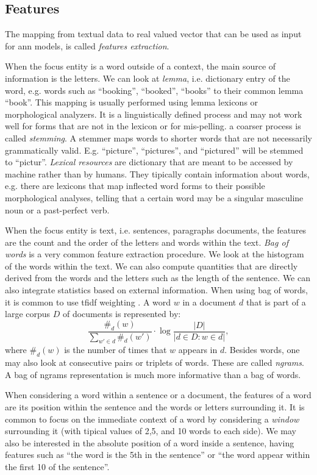 \subsection{Features}
The mapping from textual data to real valued vector that can be used
as input for \ac{ann} models, is called \emph{features extraction}.

When the focus entity is a word outside of a context, the main source
of information is the letters. We can look at \emph{lemma},
i.e. dictionary entry of the word, e.g. words such as ``booking'',
``booked'', ``books'' to their common lemma ``book''. This mapping is
usually performed using lemma lexicons or morphological analyzers. It
is a linguistically defined process and may not work well for forms
that are not in the lexicon or for mis-pelling. a coarser process is
called \emph{stemming}. A stemmer maps words to shorter words that are
not necessarily grammatically valid. E.g. ``picture'', ``pictures'',
and ``pictured'' will be stemmed to ``pictur''. \emph{Lexical
  resources} are dictionary that are meant to be accessed by machine
rather than by humans. They tipically contain information about words,
e.g. there are lexicons that map inflected word forms to their
possible morphological analyses, telling that a certain word may be a
singular masculine noun or a past-perfect verb.

When the focus entity is text, i.e. sentences, paragraphs documents,
the features are the count and the order of the letters and words
within the text. \emph{Bag of words} is a very common feature
extraction procedure. We look at the histogram of the words within the
text. We can also compute quantities that are directly derived from
the words and the letters such as the length of the sentence. We can
also integrate statistics based on external information. When using
bag of words, it is common to use \ac{tfidf} weighting
\cite{manning_introduction_2008}. A word $w$ in a document $d$ that is
part of a large corpus $D$ of documents is represented by:
\begin{equation*}
  \frac{\#_d(w)}{\sum_{w'\in d}\#_d(w')}\cdot\log\frac{|D|}{|d\in
    D:w\in d|},
\end{equation*}
where $\#_d(w)$ is the number of times that $w$ appears in
$d$. Besides words, one may also look at consecutive pairs or triplets
of words. These are called \emph{ngrams}. A bag of ngrams
representation is much more informative than a bag of words.

When considering a word within a sentence or a document, the features
of a word are its position within the sentence and the words or
letters surrounding it. It is common to focus on the immediate context
of a word by considering a \emph{window} surrounding it (with tipical
values of 2,5, and 10 words to each side). We may also be interested
in the absolute position of a word inside a sentence, having features
such as ``the word is the 5th in the sentence'' or ``the word appear
within the first 10 of the sentence''.

